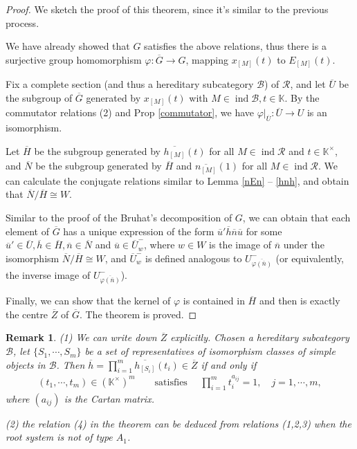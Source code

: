 \documentclass[12pt]{amsart}
\newtheorem{remark}[theorem]{Remark}
\begin{document}
\begin{proof}
    We sketch the proof of this theorem, since it's similar to the previous process.
    
    We have already showed that $G$ satisfies the above relations, thus there is a surjective group homomorphism $\varphi:\overline{G}\rightarrow G$, mapping $x_{[M]}(t)$ to $E_{[M]}(t)$.
    
    Fix a complete section (and thus a hereditary subcategory $\mathcal{B}$) of $\mathcal{R}$, and let $\overline{U}$ be the subgroup of $\overline{G}$ generated by $x_{[M]}(t)$ with $M\in \operatorname{ind}\mathcal{B}, t\in \mathbb{K}$.
    By the commutator relations (2) and Prop \ref{commutator}, we have $\varphi|_{\overline{U}}:\overline{U}\rightarrow U$ is an isomorphism. 

    Let $\overline{H}$ be the subgroup generated by $\overline{h_{[M]}}(t)$ for all $M\in \operatorname{ind}\mathcal{R}$ and $t\in \mathbb{K}^{\times}$, and $\overline{N}$ be the subgroup generated by $\overline{H}$ and $\overline{n_{[M]}}(1)$ for all $M \in \operatorname{ind}\mathcal{R}$.
    We can calculate the conjugate relations similar to Lemma \ref{nEn} -- \ref{hnh}, and obtain that $\overline{N}/\overline{H}\cong W$.

    Similar to the proof of the Bruhat's decomposition of $G$, we can obtain that each element of $\overline{G}$ has a unique expression of the form $\overline{u}'\overline{h}\overline{n}\overline{u}$ for some $\overline{u}' \in \overline{U}, \overline{h} \in \overline{H}, \overline{n}\in \overline{N}$ and $\overline{u}\in \overline{U}_{w}^{-}$, where $w\in W$ is the image of $\overline{n}$ under the isomorphism $\overline{N}/\overline{H}\cong W$, and $\overline{U}_{w}^{-}$ is defined analogous to $U_{\overline{\varphi(\overline{n})}}^{-}$ (or equivalently, the inverse image of $U_{\overline{\varphi(\overline{n})}}^{-}$).

    Finally, we can show that the kernel of $\varphi$ is contained in $\overline{H}$ and then is exactly the centre $\overline{Z}$ of $\overline{G}$. 
    The theorem is proved.
\end{proof}

\begin{remark}\label{rmkH}
    (1) We can write down $\overline{Z} $ explicitly.
    Chosen a hereditary subcategory $\mathcal{B}$, let $\{S_1,\cdots,S_m\}$ be a set of representatives of isomorphism classes of simple objects in $\mathcal{B}$.
    Then $\overline{h} = \prod\limits_{i=1}^m \overline{h_{[S_i]}}(t_i) \in \overline{Z}$ if and only if 
    \begin{align}
        (t_1,\cdots,t_m) \in (\mathbb{K}^{\times})^m \qquad \text{satisfies } \quad \prod\limits_{i=1}^m t_i^{a_{ij}} = 1,\quad  j=1,\cdots,m,
    \end{align}
    where $(a_{ij})$ is the Cartan matrix.

    (2) the relation (4) in the theorem can be deduced from relations (1,2,3) when the root system is not of type $A_1$.
\end{remark}
\end{document}
